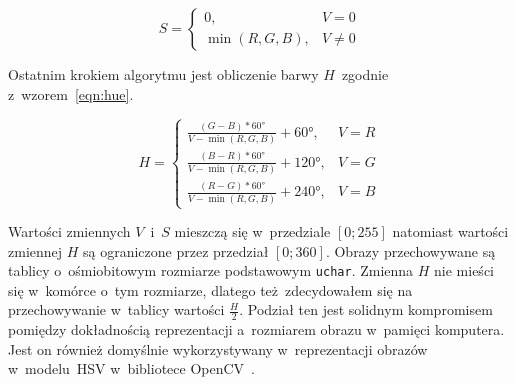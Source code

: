\begin{equation}
    \label{eqn:saturation}
    S = \left\{ 
        \begin{array}{ll}
            0, & V = 0 \\
            \min{(R, G, B)}, & V \ne 0
        \end{array} 
        \right.
\end{equation}

Ostatnim krokiem algorytmu jest obliczenie barwy $H$~zgodnie z~wzorem~\ref{eqn:hue}.

\begin{equation}
    \label{eqn:hue}
    H = \left\{ 
        \begin{array}{ll}
            \frac{(G - B) * 60\si{\degree}}{V - \min{(R, G, B)}} + 60\si{\degree}, & V = R \\
            \frac{(B - R) * 60\si{\degree}}{V - \min{(R, G, B)}} + 120\si{\degree}, & V = G \\
            \frac{(R - G) * 60\si{\degree}}{V - \min{(R, G, B)}} + 240\si{\degree}, & V = B
        \end{array} 
        \right.
\end{equation}
\smallskip

Wartości zmiennych $V$~i~$S$ mieszczą się w~przedziale $[0; 255]$ natomiast wartości zmiennej $H$ są ograniczone przez przedział $[0; 360]$. Obrazy przechowywane są tablicy o~ośmiobitowym rozmiarze podstawowym \texttt{uchar}. Zmienna $H$ nie mieści się w~komórce o~tym rozmiarze, dlatego też zdecydowałem się na przechowywanie w~tablicy wartości $\frac{H}{2}$. Podział ten jest solidnym kompromisem pomiędzy dokładnością reprezentacji a~rozmiarem obrazu w~pamięci komputera. Jest on również domyślnie wykorzystywany w~reprezentacji obrazów w~modelu~HSV w~bibliotece OpenCV~\cite{opencv}.

